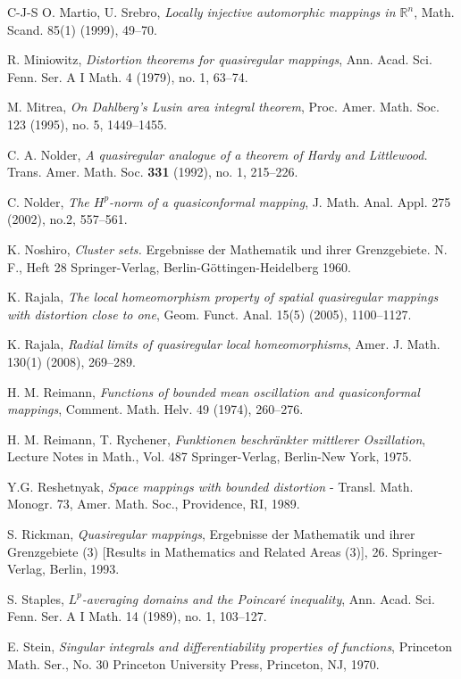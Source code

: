 \documentclass[11pt,a4paper,reqno]{amsart}
\theoremstyle{definition}
\newcommand{\Rn}{{\mathbb R}^n}
\numberwithin{komcounter}{section}
\begin{document}
\begin{thebibliography}{C-J-S}
 O. Martio, U. Srebro, \emph{Locally injective automorphic mappings in $\Rn$}, Math. Scand. 85(1) (1999), 49--70. 

 R. Miniowitz, \emph{Distortion theorems for quasiregular mappings}, Ann. Acad. Sci. Fenn. Ser. A I Math. 4 (1979), no. 1, 63--74.

 M. Mitrea, \emph{On Dahlberg's Lusin area integral theorem}, Proc. Amer. Math. Soc. 123 (1995), no. 5, 1449--1455.

 C. A. Nolder, \textit{A quasiregular analogue of a theorem of Hardy and Littlewood.} Trans. Amer. Math. Soc. \textbf{331} (1992), no. 1, 215--226.


 C. Nolder, \emph{The $H^p$-norm of a quasiconformal mapping}, J. Math. Anal. Appl. 275 (2002), no.2, 557--561.

 K. Noshiro, \emph{Cluster sets.} Ergebnisse der Mathematik und ihrer Grenzgebiete. N. F., Heft 28 Springer-Verlag, Berlin-G\"ottingen-Heidelberg 1960.

 K. Rajala, \emph{The local homeomorphism property of spatial quasiregular mappings with distortion close to one}, Geom. Funct. Anal. 15(5)  (2005), 1100--1127.

 K. Rajala, \emph{ Radial limits of quasiregular local homeomorphisms}, Amer. J. Math. 130(1) (2008),  269--289.

 H. M. Reimann, \emph{Functions of bounded mean oscillation and quasiconformal mappings}, Comment. Math. Helv. 49 (1974), 260--276.

 H. M. Reimann, T. Rychener, \emph{Funktionen beschr\"ankter mittlerer Oszillation}, Lecture Notes in Math., Vol. 487 Springer-Verlag, Berlin-New York, 1975.

 Y.G. Reshetnyak, \emph{Space mappings with bounded distortion} - Transl. Math. Monogr. 73,
Amer. Math. Soc., Providence, RI, 1989.


 S. Rickman, \emph{Quasiregular mappings}, Ergebnisse der Mathematik und ihrer Grenzgebiete (3) [Results in Mathematics and Related Areas (3)], 26. Springer-Verlag, Berlin, 1993. 

 S. Staples, \emph{$L^p$-averaging domains and the Poincar\'e inequality}, Ann. Acad. Sci. Fenn. Ser. A I Math. 14 (1989), no. 1, 103--127.

 E. Stein, \emph{Singular integrals and differentiability properties of functions}, Princeton Math. Ser., No. 30
Princeton University Press, Princeton, NJ, 1970.



\end{thebibliography}
\end{document}
